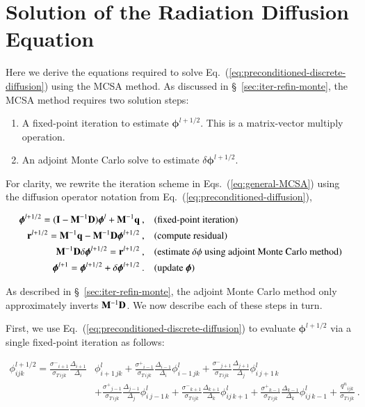 \documentclass[preprint,12pt]{elsarticle}
\newcommand{\vr}{\ensuremath{\ve{r}}}
\newcommand{\vI}{\ensuremath{\ve{I}}}
\newcommand{\qn}{\ensuremath{q^n}}
\newcommand{\Di}{\ensuremath{\Delta_i}}
\newcommand{\Dj}{\ensuremath{\Delta_j}}
\newcommand{\Dk}{\ensuremath{\Delta_k}}
\newcommand{\sigT}{\ensuremath{\sigma_{T\,ijk}}}
\newcommand{\sigm}{\ensuremath{\sigma^{-}}}
\newcommand{\sigp}{\ensuremath{\sigma^{+}}}
\newcommand{\bphi}{\ensuremath{\boldsymbol{\phi}}}
\begin{document}
\section{Solution of the Radiation Diffusion Equation}
\label{sec:solut-radi-diff}

Here we derive the equations required to solve
Eq.~(\ref{eq:preconditioned-discrete-diffusion}) using the MCSA
method.  As discussed in \S~\ref{sec:iter-refin-monte}, the MCSA
method requires two solution steps:

\begin{enumerate}
\item A fixed-point iteration to estimate $\bphi^{l+1/2}$.  This is a
  matrix-vector multiply operation.
\item An adjoint Monte Carlo solve to estimate $\delta\bphi^{l+1/2}$.
\end{enumerate}

For clarity, we rewrite the iteration scheme in
Eqs.~(\ref{eq:general-MCSA}) using the diffusion operator notation
from Eq.~(\ref{eq:preconditioned-diffusion}),

\begin{align*}
  \bphi^{l+1/2} = (\vI - \ve{M}^{-1}\ve{D})\bphi^{l} +
  \ve{M}^{-1}\ve{q}\:, \quad & (\text{fixed-point iteration})\\
  \vr^{l+1/2} = \ve{M}^{-1}\ve{q} - \ve{M}^{-1}\ve{D}\bphi^{l+1/2}\:,
  \quad & (\text{compute residual})\\
  \ve{M}^{-1}\ve{D}\delta\bphi^{l+1/2} = \vr^{l+1/2}\:, \quad&
  (\text{estimate $\delta\phi$ using adjoint Monte Carlo method})\\
  \bphi^{l+1} = \bphi^{l+1/2} + \delta\bphi^{l+1/2}\:. \quad&
  (\text{update}\ \bphi)
\end{align*}

As described in \S~\ref{sec:iter-refin-monte}, the adjoint Monte Carlo
method only approximately inverts $\mathbf{M}^{-1}\mathbf{D}$.  We now
describe each of these steps in turn.

First, we use Eq.~(\ref{eq:preconditioned-discrete-diffusion}) to
evaluate $\bphi^{l+1/2}$ via a single fixed-point iteration as
follows:

\begin{equation}
  \begin{aligned}
    \phi_{ijk}^{l+1/2} =  
    \frac{\sigm_{i+1}}{\sigT}\frac{\Delta_{i+1}}{\Di}&\phi_{i+1\,jk}^l
    + \frac{\sigp_{i-1}}{\sigT}\frac{\Delta_{i-1}}{\Di}\phi_{i-1\,jk}^l
    +
    \frac{\sigm_{j+1}}{\sigT}\frac{\Delta_{j+1}}{\Dj}\phi_{i\,j+1\,k}^l \\ 
    &+ \frac{\sigp_{j-1}}{\sigT}\frac{\Delta_{j-1}}{\Dj}\phi_{i\,j-1\,k}^l 
    + \frac{\sigm_{k+1}}{\sigT}\frac{\Delta_{k+1}}{\Dk}\phi_{ij\,k+1}^l
    + \frac{\sigp_{k-1}}{\sigT}\frac{\Delta_{k-1}}{\Dk}\phi_{ij\,k-1}^l
    + \frac{\qn_{ijk}}{\sigT}\:.
  \end{aligned}
\end{equation}
\end{document}
